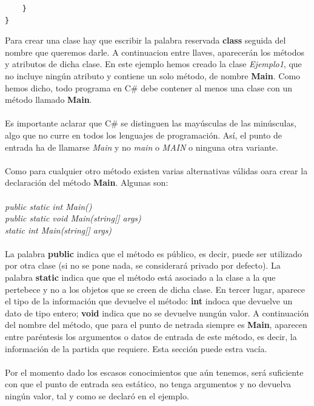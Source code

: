 \documentclass[12pt,a4paper]{report}
\begin{document}
{\begin{lstlisting}
	}
}
\end{lstlisting}
Para crear una clase hay que escribir la palabra reservada \textbf{class} seguida del nombre que queremos darle. A continuacion entre llaves, aparecerán los métodos y atributos de dicha clase. En este ejemplo hemos creado la clase \textit{Ejemplo1}, que no incluye ningún atributo y contiene un solo método, de nombre \textbf{Main}. Como hemos dicho, todo programa en C\# debe contener al menos una clase con un método llamado \textbf{Main}.\\\\Es importante aclarar que C\# se distinguen las mayúsculas de las minúsculas, algo que no curre en todos los lenguajes de programación. Así, el punto de entrada ha de llamarse \textit{Main} y no \textit{main} o \textit{MAIN} o ninguna otra variante.\\\\Como para cualquier otro método existen varias alternativas válidas oara crear la declaración del método \textbf{Main}. Algunas son: \\\\\textit{public static int Main()\\public static void Main(string[] args)\\static int Main(string[] args)}\\\\La palabra \textbf{public} indica que el método es público, es decir, puede ser utilizado por otra clase (si no se pone nada, se considerará privado por defecto). La palabra \textbf{static} indica que que el método está asociado a la clase a la que pertebece y no a los objetos que se creen de dicha clase. En tercer lugar, aparece el tipo de la información que devuelve el método: \textbf{int} indoca que devuelve un dato de tipo entero; \textbf{void}  indica que no se devuelve nungún valor. A continuación del nombre del método, que para el punto de netrada siempre es \textbf{Main}, aparecen entre paréntesis los argumentos o datos de entrada de este método, es decir, la información de la partida que requiere. Esta sección puede estra vacía.\\\\Por el momento dado los escasos conocimientos que aún tenemos, será suficiente con que el punto de entrada sea estático, no tenga argumentos y no devuelva ningún valor, tal y como se declaró en el ejemplo.
}
\end{document}
